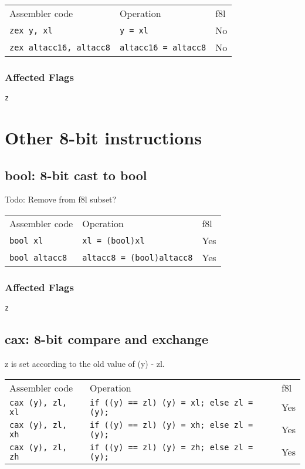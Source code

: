 \documentclass{book}
\begin{document}
\begin{tabular}{l l l}
Assembler code                 & Operation                   & f8l \\
\texttt{zex y, xl}             & \texttt{y = xl}         & No \\
\texttt{zex altacc16, altacc8} & \texttt{altacc16 = altacc8} & No \\
\end{tabular}

\subsubsection*{Affected Flags}

\texttt{z}


\section{Other 8-bit instructions}

\subsection{bool: 8-bit cast to bool}

Todo: Remove from f8l subset?

\begin{tabular}{l l l}
Assembler code        & Operation                        & f8l \\
\texttt{bool xl}      & \texttt{xl = (bool)xl}           & Yes \\
\texttt{bool altacc8} & \texttt{altacc8 = (bool)altacc8} & Yes \\
\end{tabular}

\subsubsection*{Affected Flags}

\texttt{z}


\subsection{cax: 8-bit compare and exchange}

z is set according to the old value of (y) - zl.

\begin{tabular}{l l l}
Assembler code            & Operation                                        & f8l \\
\texttt{cax (y), zl, xl}  & \texttt{if ((y) == zl) (y) = xl; else zl = (y);} & Yes \\
\texttt{cax (y), zl, xh}  & \texttt{if ((y) == zl) (y) = xh; else zl = (y);} & Yes \\
\texttt{cax (y), zl, zh}  & \texttt{if ((y) == zl) (y) = zh; else zl = (y);} & Yes
\end{tabular}
\end{document}

